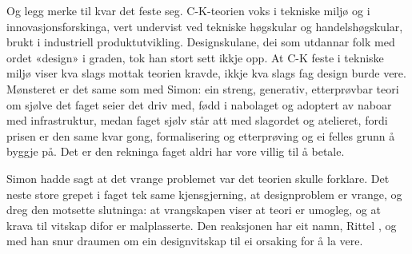 Og legg merke til kvar det feste seg. C-K-teorien voks i tekniske miljø og i innovasjonsforskinga, vert undervist ved tekniske høgskular og handelshøgskular, brukt i industriell produktutvikling. Designskulane, dei som utdannar folk med ordet «design» i graden, tok han stort sett ikkje opp. At C-K feste i tekniske miljø viser kva slags mottak teorien kravde, ikkje kva slags fag design burde vere. Mønsteret er det same som med Simon: ein streng, generativ, etterprøvbar teori om sjølve det faget seier det driv med, fødd i nabolaget og adoptert av naboar med infrastruktur, medan faget sjølv står att med slagordet og atelieret, fordi prisen er den same kvar gong, formalisering og etterprøving og ei felles grunn å byggje på. Det er den rekninga faget aldri har vore villig til å betale.

\vignett

Simon hadde sagt at det vrange problemet var det teorien skulle forklare. Det neste store grepet i faget tek same kjensgjerning, at designproblem er vrange, og dreg den motsette slutninga: at vrangskapen viser at teori er umogleg, og at krava til vitskap difor er malplasserte. Den reaksjonen har eit namn, Rittel \autocite{rittel1973}, og med han snur draumen om ein designvitskap til ei orsaking for å la vere.


